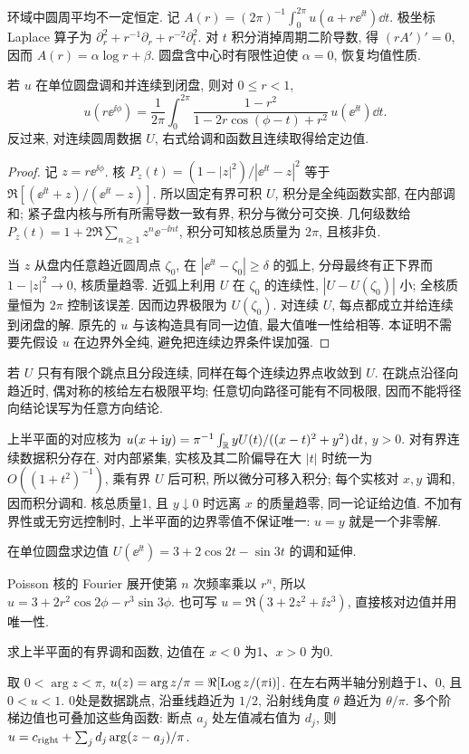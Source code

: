 环域中圆周平均不一定恒定. 记 $A(r)=(2\pi)^{-1}\int_0^{2\pi}u(a+r\ee^{\ii t})\dd t$. 极坐标 Laplace 算子为 $\partial_r^2+r^{-1}\partial_r+r^{-2}\partial_t^2$. 对 $t$ 积分消掉周期二阶导数, 得 $(rA')'=0$, 因而 $A(r)=\alpha\log r+\beta$. 圆盘含中心时有限性迫使 $\alpha=0$, 恢复均值性质.

\begin{theorem}[圆盘 Poisson 公式]\label{thm:poisson}
若 $u$ 在单位圆盘调和并连续到闭盘, 则对 $0\le r<1$,
\[
u(r\ee^{\ii\phi})=\frac1{2\pi}\int_0^{2\pi}
\frac{1-r^2}{1-2r\cos(\phi-t)+r^2}\,u(\ee^{\ii t})\dd t.
\]
反过来, 对连续圆周数据 $U$, 右式给调和函数且连续取得给定边值.
\end{theorem}
\begin{proof}
记 $z=r\ee^{\ii\phi}$. 核 $P_z(t)=(1-|z|^2)/|\ee^{\ii t}-z|^2$ 等于 $\Re[(\ee^{\ii t}+z)/(\ee^{\ii t}-z)]$. 所以固定有界可积 $U$, 积分是全纯函数实部, 在内部调和; 紧子盘内核与所有所需导数一致有界, 积分与微分可交换. 几何级数给 $P_z(t)=1+2\Re\sum_{n\ge1}z^n\ee^{-\ii nt}$, 积分可知核总质量为 $2\pi$, 且核非负.

当 $z$ 从盘内任意趋近圆周点 $\zeta_0$, 在 $|\ee^{\ii t}-\zeta_0|\ge\delta$ 的弧上, 分母最终有正下界而 $1-|z|^2\to0$, 核质量趋零. 近弧上利用 $U$ 在 $\zeta_0$ 的连续性, $|U-U(\zeta_0)|$ 小; 全核质量恒为 $2\pi$ 控制该误差. 因而边界极限为 $U(\zeta_0)$. 对连续 $U$, 每点都成立并给连续到闭盘的解. 原先的 $u$ 与该构造具有同一边值, 最大值唯一性给相等. 本证明不需要先假设 $u$ 在边界外全纯, 避免把连续边界条件误加强.
\end{proof}
若 $U$ 只有有限个跳点且分段连续, 同样在每个连续边界点收敛到 $U$. 在跳点沿径向趋近时, 偶对称的核给左右极限平均; 任意切向路径可能有不同极限, 因而不能将径向结论误写为任意方向结论.

上半平面的对应核为 $u(x+\mathrm i y)=\pi^{-1}\int_\mathbb R yU(t)/((x-t)^2+y^2)\,\mathrm d t$, $y>0$. 对有界连续数据积分存在. 对内部紧集, 实核及其二阶偏导在大 $|t|$ 时统一为 $O((1+t^2)^{-1})$, 乘有界 $U$ 后可积, 所以微分可移入积分; 每个实核对 $x,y$ 调和, 因而积分调和. 核总质量1, 且 $y\downarrow0$ 时远离 $x$ 的质量趋零, 同一论证给边值. 不加有界性或无穷远控制时, 上半平面的边界零值不保证唯一: $u=y$ 就是一个非零解.
\begin{example}
在单位圆盘求边值 $U(\ee^{\ii t})=3+2\cos2t-\sin3t$ 的调和延伸.
\end{example}
\begin{solution}
Poisson 核的 Fourier 展开使第 $n$ 次频率乘以 $r^n$, 所以 $u=3+2r^2\cos2\phi-r^3\sin3\phi$. 也可写 $u=\Re(3+2z^2+\ii z^3)$, 直接核对边值并用唯一性.
\end{solution}
\begin{example}
求上半平面的有界调和函数, 边值在 $x<0$ 为1、$x>0$ 为0.
\end{example}
\begin{solution}
取 $0<\arg z<\pi$, $u(z)=\arg z/\pi=\Re[\operatorname{Log} z/(\pi\mathrm i)]$. 在左右两半轴分别趋于1、0, 且 $0<u<1$. 0处是数据跳点, 沿垂线趋近为 $1/2$, 沿射线角度 $\theta$ 趋近为 $\theta/\pi$. 多个阶梯边值也可叠加这些角函数: 断点 $a_j$ 处左值减右值为 $d_j$, 则 $u=c_{\rm right}+\sum_j d_j\arg(z-a_j)/\pi$.
\end{solution}


